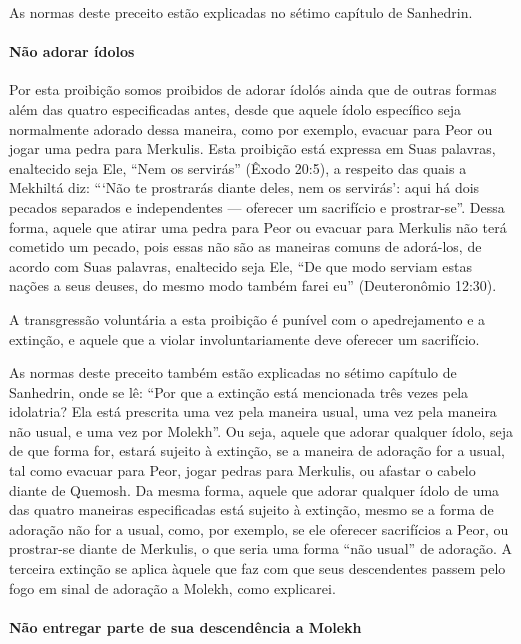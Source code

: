As normas deste preceito estão explicadas no sétimo capítulo de Sanhedrin.

\paragraph{Não adorar ídolos}

Por esta proibição somos proibidos de adorar ídolós ainda que de outras
formas além das quatro especificadas antes, desde que aquele ídolo
específico seja normalmente adorado dessa maneira, como por exemplo,
evacuar para Peor ou jogar uma pedra para Merkulis. Esta proibição está
expressa em Suas palavras, enaltecido seja Ele, ``Nem os servirás''
(Êxodo 20:5), a respeito das quais a Mekhiltá diz: ```Não te prostrarás
diante deles, nem os servirás': aqui há dois pecados separados e
independentes --- oferecer um sacrifício e prostrar-se''. Dessa forma,
aquele que atirar uma pedra para Peor ou evacuar para Merkulis não terá cometido um pecado, pois essas não são as maneiras comuns
de adorá-los, de acordo com Suas palavras, enaltecido seja Ele, ``De que
modo serviam estas nações a seus deuses, do mesmo modo também farei eu''
(Deuteronômio 12:30).

A transgressão voluntária a esta proibição é punível com o apedrejamento
e a extinção, e aquele que a violar involuntariamente deve oferecer um
sacrifício.

As normas deste preceito também estão explicadas no sétimo capítulo de
Sanhedrin, onde se lê: ``Por que a extinção está mencionada três vezes
pela idolatria? Ela está prescrita uma vez pela maneira usual, uma vez
pela maneira não usual, e uma vez por Molekh''. Ou seja, aquele que
adorar qualquer ídolo, seja de que forma for, estará sujeito à extinção,
se a maneira de adoração for a usual, tal como evacuar para Peor, jogar
pedras para Merkulis, ou afastar o cabelo diante de Quemosh. Da mesma
forma, aquele que adorar qualquer ídolo de uma das quatro maneiras
especificadas está sujeito à extinção, mesmo se a forma de adoração não
for a usual, como, por exemplo, se ele oferecer sacrifícios a Peor, ou
prostrar-se diante de Merkulis, o que seria uma forma ``não usual'' de
adoração. A terceira extinção se aplica àquele que faz com que seus
descendentes passem pelo fogo em sinal de adoração a Molekh, como
explicarei.

\paragraph{Não entregar parte de sua descendência a Molekh}

